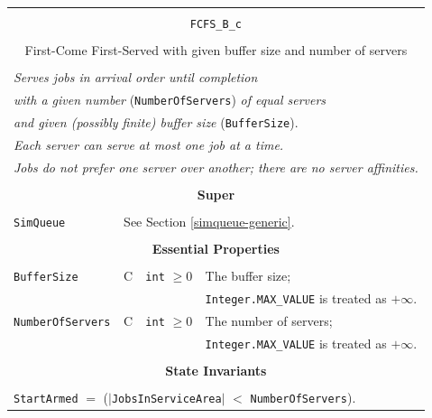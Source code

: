 \documentclass[12pt]{book}
\begin{document}
\begin{tabular}{|l|l|l|l|}
\hline
\multicolumn{4}{|c|}{} \\
\multicolumn{4}{|c|}{\lstinline[basicstyle=\large]{FCFS_B_c}} \\
\multicolumn{4}{|c|}{} \\
\multicolumn{4}{|c|}{First-Come First-Served with given buffer size and number of servers} \\
\multicolumn{4}{|c|}{} \\
\hline
\multicolumn{4}{|l|}{\em Serves jobs in arrival order until completion\/} \\
\multicolumn{4}{|l|}{{\em with a given number\/} (\lstinline|NumberOfServers|) {\em of equal servers}} \\
\multicolumn{4}{|l|}{{\em and given (possibly finite) buffer size\/} (\lstinline|BufferSize|).} \\
\multicolumn{4}{|l|}{\em Each server can serve at most one job at a time.} \\
\multicolumn{4}{|l|}{\em Jobs do not prefer one server over another; there are no server affinities.} \\
\hline
\multicolumn{4}{|c|}{} \\
\multicolumn{4}{|c|}{\bf Super} \\
\multicolumn{4}{|c|}{} \\
\hline
\lstinline|SimQueue| & \multicolumn{3}{|l|}{See Section \ref{simqueue-generic}.} \\
\hline
\multicolumn{4}{|c|}{} \\
\multicolumn{4}{|c|}{\bf Essential Properties} \\
\multicolumn{4}{|c|}{} \\
\hline
\lstinline|BufferSize|      & C & \lstinline|int| $\geq 0$
                            & The buffer size; \\
                        & & & \lstinline|Integer.MAX_VALUE| is treated as $+\infty$. \\
\hline
\lstinline|NumberOfServers| & C & \lstinline|int| $\geq 0$
                            & The number of servers; \\
                        & & & \lstinline|Integer.MAX_VALUE| is treated as $+\infty$. \\
\hline
\multicolumn{4}{|c|}{} \\
\multicolumn{4}{|c|}{\bf State  Invariants} \\
\multicolumn{4}{|c|}{} \\
\hline
\multicolumn{4}{|l|}{\lstinline|StartArmed| $=$ ($|$\lstinline|JobsInServiceArea|$|$ $<$ \lstinline|NumberOfServers|).} \\

\end{tabular}
\end{document}

